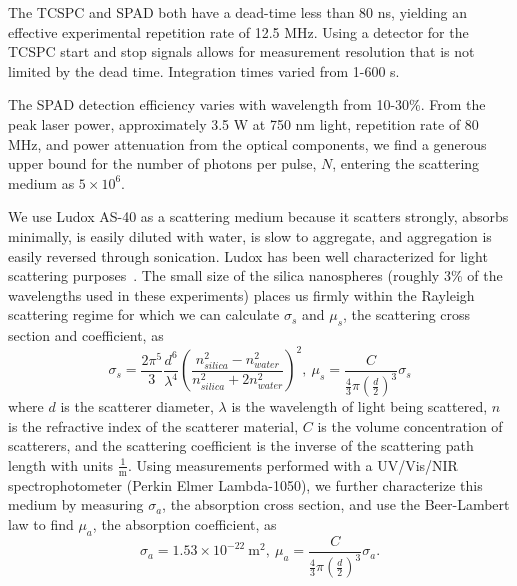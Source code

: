 The TCSPC and SPAD both have a dead-time less than 80 ns, yielding an effective experimental repetition rate of 12.5 MHz. Using a detector for the TCSPC start and stop signals allows for measurement resolution that is not limited by the dead time. Integration times varied from 1-600 s.

The SPAD detection efficiency varies with wavelength from 10-30\%. From the peak laser power, approximately 3.5 W at 750 nm light, repetition rate of 80 MHz, and power attenuation from the optical components, we find a generous upper bound for the number of photons per pulse, $N$, entering the scattering medium as $5 \times 10^{6}$.

We use Ludox AS-40 as a scattering medium because it scatters strongly, absorbs minimally, is easily diluted with water, is slow to aggregate, and aggregation is easily reversed through sonication. Ludox has been well characterized for light scattering purposes~\cite{dezelic_determination_1960,bonnelycke_light_1959,goring_light-scattering_1957}. The small size of the silica nanospheres (roughly 3\% of the wavelengths used in these experiments) places us firmly within the Rayleigh scattering regime for which we can calculate $\sigma_{s}$ and $\mu_{s}$, the scattering cross section and coefficient, as~\cite{bohren_absorption_1983, chandrasekhar_radiative_1950} 
%
\begin{equation}\label{eq:scatter}
    \sigma_{s} =  \frac{2 \pi^{5}}{3} \frac{d^{6}}{\lambda^{4}}\left(\frac{n_{silica}^{2}-n_{water}^{2}}{n_{silica}^{2}+2n_{water}^{2}}\right)^{2},\ \mu_{s} = \frac{C}{\frac{4}{3} \pi \left(\frac{d}{2}\right)^{3}} \sigma_{s}
\end{equation}
%
where $d$ is the scatterer diameter, $\lambda$ is the wavelength of light being scattered, $n$ is the refractive index of the scatterer material, $C$ is the volume concentration of scatterers, and the scattering coefficient is the inverse of the scattering path length with units $\frac{1}{\textrm{m}}$. Using measurements performed with a UV/Vis/NIR spectrophotometer (Perkin Elmer Lambda-1050), we further characterize this medium by measuring $\sigma_{a}$, the absorption cross section, and use the Beer-Lambert law to find $\mu_{a}$, the absorption coefficient, as~\cite{lakowicz_principles_2006} 
%
\begin{equation}\label{eq:absorb}
    \sigma_{a} = 1.53\times 10^{-22}\ \textrm{m}^{2},\ \mu_{a} = \frac{C}{\frac{4}{3} \pi \left(\frac{d}{2}\right)^{3}} \sigma_{a}.
\end{equation}
%
%


